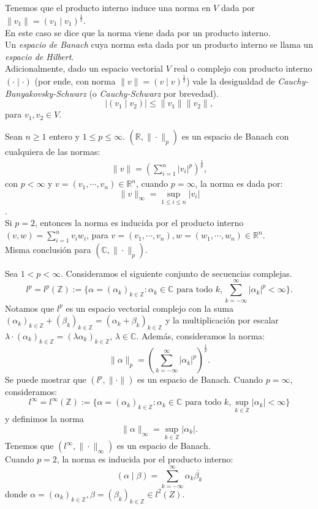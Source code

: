     Tenemos que el producto interno induce una norma en $V$ dada por $\|v_1\|=(v_1\mid v_1)^{\frac{1}{2}}$.\\
    En este caso se dice que la norma viene dada por un producto interno.\\
    Un \textit{espacio de Banach} cuya norma esta dada por un producto interno se llama un \textit{espacio de Hilbert}.\\
    Adicionalmente, dado un espacio vectorial $V$ real o complejo con producto interno $(\cdot\mid\cdot)$ (por ende, con norma $\|v\|=(v\mid v)^{\frac{1}{2}}$) vale la desigualdad de \textit{Cauchy-Bunyakovsky-Schwarz} (o \textit{Cauchy-Schwarz} por brevedad).
    $$|(v_1\mid v_2)|\leq \|v_1\|\|v_2\|,$$
    para $v_1,v_2\in V$.\\
    \begin{example}
      Sean $n\geq 1$ entero y $1\leq p \leq \infty$. $(\mathbb{R},\|\cdot\|_{p})$ es un espacio de Banach con cualquiera de las normas:
      \begin{align*}
        \|v\|=\left(\sum_{i=1}^{n}|v_i|^{p}\right)^{\frac{1}{p}},
      \end{align*}
      con $p<\infty$ y $v=(v_1,\cdots,v_n)\in\mathbb{R}^{n}$, cuando $p=\infty$, la norma es dada por:
      $$\|v\|_{\infty}=\sup_{1\leq i\leq n}|v_i|$$.\\
      Si $p=2$, entonces la norma es inducida por el producto interno $(v,w)=\sum_{i=1}^{n}v_iw_i$, para $v=(v_1,\cdots,v_n),w=(w_1,\cdots,w_n)\in\mathbb{R}^{n}$.\\
      Misma conclusión para $(\mathbb{C},\|\cdot\|_{p})$.
    \end{example}
    \begin{example}[Espacios $l^{p}$]
      Sea $1 < p < \infty$. Consideramos el siguiente conjunto de secuencias complejas.
      $$l^{p} =l^{p}(\mathbb{Z}):=\{\alpha = (\alpha_k)_{k\in\mathbb{Z}}: \alpha_k \in \mathbb{C} \text{ para todo }k, \sum_{k=-\infty}^{\infty}|\alpha_k|^{p} < \infty\}.$$
      Notamos que $l^{p}$ es un espacio vectorial complejo con la suma $(\alpha_k)_{k\in\mathbb{Z}} + (\beta_k)_{k\in\mathbb{Z}} =(\alpha_k +\beta_k)_{k\in\mathbb{Z}}$ y la multiplicación por escalar $\lambda\cdot(\alpha_k)_{k\in\mathbb{Z}} = (\lambda\alpha_k)_{k\in\mathbb{Z}}$, $\lambda \in \mathbb{C}$. Además, consideramos la norma:
      $$\|\alpha\|_{p}=\left(\sum_{k=-\infty}^{\infty}|\alpha_k|^{p}\right)^{\frac{1}{p}}.$$
      Se puede mostrar que $(l^{p}, \|\cdot\|)$ es un espacio de Banach. Cuando $p = \infty$, consideramos:
      $$l^{\infty} =l^{\infty}(\mathbb{Z}) := \{\alpha = (\alpha_k)_{k\in\mathbb{Z}} : \alpha_k \in \mathbb{C} \text{ para todo }k, \sup_{k\in\mathbb{Z}} |\alpha_k| < \infty\}$$
      y definimos la norma
      $$\|\alpha\|_{\infty} = \sup_{k\in\mathbb{Z}} |\alpha_k|.$$
      Tenemos que $(l^{\infty}, \|\cdot\|_{\infty})$ es un espacio de Banach.\\
      Cuando $p=2$, la norma es inducida por el producto interno:
      $$(\alpha\mid\beta)=\sum_{k=-\infty}^{\infty}\alpha_k\overline{\beta_k}$$
      donde $\alpha = (\alpha_k)_{k\in\mathbb{Z}}, \beta = (\beta_k)_{k\in\mathbb{Z}} \in l^{2}(Z)$.
    \end{example}

